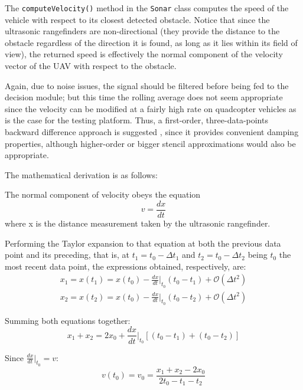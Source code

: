 The \texttt{computeVelocity()} method in the \texttt{Sonar} class computes the speed of the vehicle with respect to its closest detected obstacle.
Notice that since the ultrasonic rangefinders are non-directional (they provide the distance to the obstacle regardless of the direction it is found, as long as it lies within its field of view), the returned speed is effectively the normal component of the velocity vector of the UAV with respect to the obstacle.

Again, due to noise issues, the signal should be filtered before being fed to the decision module; but this time the rolling average does not seem appropriate since the velocity can be modified at a fairly high rate on quadcopter vehicles as is the case for the testing platform.
Thus, a first-order, three-data-points backward difference approach is suggested \cite{asselin1972}, since it provides convenient damping properties, although higher-order or bigger stencil approximations would also be appropriate.

The mathematical derivation is as follows:

The normal component of velocity obeys the equation
\begin{equation}
	v=\frac{d x}{d t}
	\label{eq:v}
\end{equation}
where x is the distance measurement taken by the ultrasonic rangefinder.

Performing the Taylor expansion to that equation at both the previous data point and its preceding, that is, at $t_1=t_0-\Delta t_1$ and $t_2=t_0-\Delta t_2$ being $t_0$ the most recent data point, the expressions obtained, respectively, are:
\begin{eqnarray}
	x_1=x\left(t_1\right)=x\left(t_0\right) 
		- \frac{dx}{dt} \Bigg\rvert_{t_0} \left(t_0-t_1\right) 
		+ \mathcal{O}\left(\Delta t^2\right)	\\
	x_2=x\left(t_2\right)=x\left(t_0\right)
		- \frac{dx}{dt} \Bigg\rvert_{t_0} \left(t_0-t_2\right) 
		+ \mathcal{O}\left(\Delta t^2\right)
	\label{eq:taylor}
\end{eqnarray}

Summing both equations together:
\begin{equation}
	x_1+x_2=2x_0+\frac{dx}{dt}\Bigg\rvert_{t_0}
		\left[\left(t_0-t_1\right)+\left(t_0-t_2\right)\right]
	\label{eq:finite}
\end{equation}

Since $\frac{dx}{dt}\big\rvert_{t_0}=v$:
\begin{equation}
	v\left(t_0\right)=v_0=\frac{x_1+x_2-2x_0}{2t_0-t_1-t_2}
	\label{eq:finitediff}
\end{equation}

